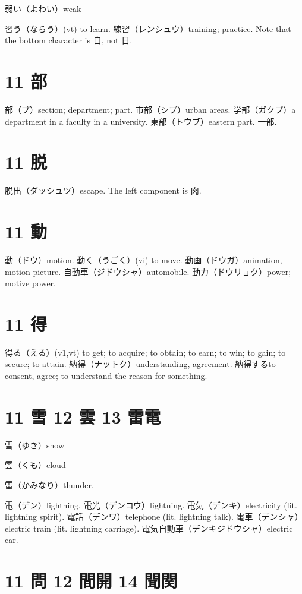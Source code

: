 弱い（よわい）weak

習う（ならう）(vt) to learn.
練習（レンシュウ）training; practice.
Note that the bottom character is 自, not 日.

\section{11 部}

部（ブ）section; department; part.
市部（シブ）urban areas.
学部（ガクブ）a department in a faculty in a university.
東部（トウブ）eastern part.
一部.

\section{11 脱}

脱出（ダッシュツ）escape.
The left component is 肉.

\section{11 動}

動（ドウ）motion.
動く（うごく）(vi) to move.
動画（ドウガ）animation, motion picture.
自動車（ジドウシャ）automobile.
動力（ドウリョク）power; motive power.

\section{11 得}

得る（える）(v1,vt) to get; to acquire; to obtain; to earn; to win; to gain; to secure; to attain.
納得（ナットク）understanding, agreement.
納得するto consent, agree; to understand the reason for something.

\section{11 雪 12 雲 13 雷電}

雪（ゆき）snow

雲（くも）cloud

雷（かみなり）thunder.

電（デン）lightning.
電光（デンコウ）lightning.
電気（デンキ）electricity (lit. lightning spirit).
電話（デンワ）telephone (lit. lightning talk).
電車（デンシャ）electric train (lit. lightning carriage).
電気自動車（デンキジドウシャ）electric car.

\section{11 問 12 間開 14 聞関}

